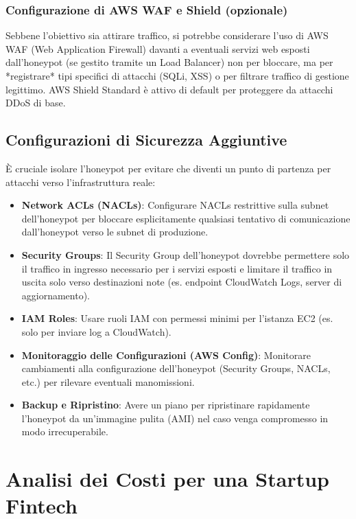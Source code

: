 \subsubsection{Configurazione di AWS WAF e Shield (opzionale)}
\label{subsubsec:config_waf}

Sebbene l'obiettivo sia attirare traffico, si potrebbe considerare l'uso di AWS WAF (Web Application Firewall) davanti a eventuali servizi web esposti dall'honeypot (se gestito tramite un Load Balancer) non per bloccare, ma per *registrare* tipi specifici di attacchi (SQLi, XSS) o per filtrare traffico di gestione legittimo. AWS Shield Standard è attivo di default per proteggere da attacchi DDoS di base.

\subsection{Configurazioni di Sicurezza Aggiuntive}
\label{subsec:sicurezza_aggiuntiva}

È cruciale isolare l'honeypot per evitare che diventi un punto di partenza per attacchi verso l'infrastruttura reale:

\begin{itemize}
    \item \textbf{Network ACLs (NACLs)}: Configurare NACLs restrittive sulla subnet dell'honeypot per bloccare esplicitamente qualsiasi tentativo di comunicazione dall'honeypot verso le subnet di produzione.
    \item \textbf{Security Groups}: Il Security Group dell'honeypot dovrebbe permettere solo il traffico in ingresso necessario per i servizi esposti e limitare il traffico in uscita solo verso destinazioni note (es. endpoint CloudWatch Logs, server di aggiornamento).
    \item \textbf{IAM Roles}: Usare ruoli IAM con permessi minimi per l'istanza EC2 (es. solo per inviare log a CloudWatch).
    \item \textbf{Monitoraggio delle Configurazioni (AWS Config)}: Monitorare cambiamenti alla configurazione dell'honeypot (Security Groups, NACLs, etc.) per rilevare eventuali manomissioni.
    \item \textbf{Backup e Ripristino}: Avere un piano per ripristinare rapidamente l'honeypot da un'immagine pulita (AMI) nel caso venga compromesso in modo irrecuperabile.
\end{itemize}

\section{Analisi dei Costi per una Startup Fintech}
\label{sec:analisi_costi}

